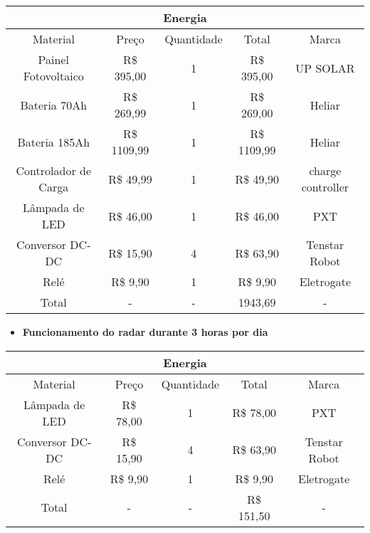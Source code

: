 \begin{table}[H]
\begin{tabular}{|c|c|c|c|c|}
\hline
\multicolumn{5}{|c|}{Energia}                                                 \\ \hline
Material             & Preço         & Quantidade & Total         & Marca     \\ \hline
Painel Fotovoltaico  & R\$ 395,00  & 1          & R\$ 395,00  & UP SOLAR    \\ \hline
Bateria 70Ah             & R\$ 269,99  & 1          & R\$ 269,00  & Heliar  \\ \hline
Bateria 185Ah             & R\$ 1109,99  & 1          & R\$ 1109,99  & Heliar  \\ \hline
Controlador de Carga & R\$ 49,99  & 1          & R\$ 49,90  & charge controller \\ \hline
Lâmpada de LED       & R\$ 46,00 & 1          & R\$ 46,00 & PXT         \\ \hline
Conversor DC-DC       & R\$ 15,90 & 4          & R\$ 63,90 & Tenstar Robot         \\ \hline
Relé       & R\$ 9,90 & 1          & R\$ 9,90 & Eletrogate         \\ \hline
Total & - & - & 1943,69 & - \\ \hline
\end{tabular}
\end{table}



\begin{itemize}
    \item \textbf{Funcionamento do radar durante 3 horas por dia}
\end{itemize}
\begin{table}[H]
\begin{tabular}{|c|c|c|c|c|}
\hline
\multicolumn{5}{|c|}{Energia}                                                 \\ \hline
Material             & Preço         & Quantidade & Total         & Marca     \\ \hline
Lâmpada de LED       & R\$ 78,00 & 1          & R\$ 78,00 & PXT         \\ \hline
Conversor DC-DC       & R\$ 15,90 & 4          & R\$ 63,90 & Tenstar Robot         \\ \hline
Relé       & R\$ 9,90 & 1          & R\$ 9,90 & Eletrogate         \\ \hline
Total & - & - & R\$ 151,50 & - \\ \hline
\end{tabular}
\end{table}
